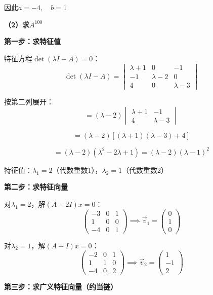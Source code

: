 \documentclass[standard]{ExBook}
\begin{document}
\begin{qitems}
\begin{bbox}
\begin{solution}
            因此$\boxed{a = -4, \quad b = 1}$
            
            \textbf{（2）求$A^{100}$}
            
            \textbf{第一步：求特征值}
            
            特征方程$\det(\lambda I - A) = 0$：
            $$\det(\lambda I - A) = \begin{vmatrix} \lambda+1 & 0 & -1 \\ -1 & \lambda-2 & 0 \\ 4 & 0 & \lambda-3 \end{vmatrix}$$
            
            按第二列展开：
            $$= (\lambda-2) \begin{vmatrix} \lambda+1 & -1 \\ 4 & \lambda-3 \end{vmatrix}$$
            
            $$= (\lambda-2)[(\lambda+1)(\lambda-3) + 4]$$
            
            $$= (\lambda-2)(\lambda^2 - 2\lambda + 1) = (\lambda-2)(\lambda-1)^2$$
            
            特征值：$\lambda_1 = 2$（代数重数1），$\lambda_2 = 1$（代数重数2）
            
            \textbf{第二步：求特征向量}
            
            对$\lambda_1 = 2$，解$(A-2I)x = 0$：
            $$\begin{pmatrix} -3 & 0 & 1 \\ 1 & 0 & 0 \\ -4 & 0 & 1 \end{pmatrix} \implies \vec{v}_1 = \begin{pmatrix} 0 \\ 1 \\ 0 \end{pmatrix}$$
            
            对$\lambda_2 = 1$，解$(A-I)x = 0$：
            $$\begin{pmatrix} -2 & 0 & 1 \\ 1 & 1 & 0 \\ -4 & 0 & 2 \end{pmatrix} \implies \vec{v}_2 = \begin{pmatrix} 1 \\ -1 \\ 2 \end{pmatrix}$$
            
            \textbf{第三步：求广义特征向量（约当链）}
            

\end{solution}
\end{bbox}
\end{qitems}
\end{document}
